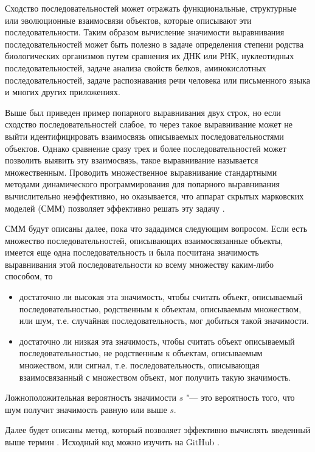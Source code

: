 \documentclass[specialist,
substylefile = spbu_report.rtx,
subf,href,colorlinks=true, 12pt]{disser}
\begin{document}
		Сходство последовательностей может отражать функциональные, структурные или эволюционные взаимосвязи объектов, которые описывают эти последовательности. Таким образом вычисление значимости выравнивания последовательностей может быть полезно в задаче определения степени родства биологических организмов путем сравнения их ДНК или РНК, нуклеотидных последовательностей, задаче анализа свойств белков, аминокислотных последовательностей, задаче распознавания речи человека или письменного языка и многих других приложениях.
		
		Выше был приведен пример попарного выравнивания двух строк, но если сходство последовательностей слабое, то через такое выравнивание может не выйти идентифицировать взаимосвязь описываемых последовательностями объектов. Однако сравнение сразу трех и более последовательностей может позволить выявить эту взаимосвязь, такое выравнивание называется множественным. Проводить множественное выравнивание стандартными методами динамического программирования для попарного выравнивания \cite{Compeau2015} вычислительно неэффективно, но оказывается, что аппарат скрытых марковских моделей (СММ) позволяет эффективно решать эту задачу \cite{Dugad1996, Compeau2015a}. 
		
		СММ будут описаны далее, пока что зададимся следующим вопросом. Если есть множество последовательностей, описывающих взаимосвязанные объекты, имеется еще одна последовательность и была посчитана значимость выравнивания этой последовательности ко всему множеству каким-либо способом, то
		\begin{itemize}
			\item достаточно ли высокая эта значимость, чтобы считать объект, описываемый последовательностью, родственным к объектам, описываемым множеством, или шум, т.е. случайная последовательность, мог добиться такой значимости.
			\item достаточно ли низкая эта значимость, чтобы считать объект описываемый последовательностью, не родственным к объектам, описываемым множеством, или сигнал, т.е. последовательность, описывающая взаимосвязанный с множеством объект, мог получить такую значимость. 
		\end{itemize}
		Ложноположительная вероятность значимости $s$ "--- это вероятность того, что шум получит значимость равную или выше $s$. 
		
		Далее будет описаны метод, который позволяет эффективно вычислять введенный выше термин \cite{Newberg2009}. Исходный код можно изучить на GitHub \cite{Vlasenko2022}.
		
\end{document}
